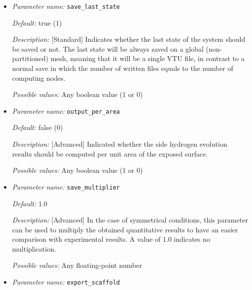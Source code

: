 \begin{itemize}
{\it Description:} [Standard] The interval of saving results, text and VTK (if selected), to disk. 

{\it Possible values:} Any floating-point number


\item {\it Parameter name:} {\tt save\_last\_state}
\label{parameters:save_last_state}


{\it Default:} true (1)

{\it Description:} [Standard] Indicates whether the last state of the system should be saved or not. The last state will be always saved on a global (non-partitioned) mesh, meaning that it will be a single VTU file, in contrast to a normal save in which the number of written files equals to the number of computing nodes.

{\it Possible values:} Any boolean value (1 or 0)


\item {\it Parameter name:} {\tt output\_per\_area}
\label{parameters:output_per_area}


{\it Default:} false (0)

{\it Description:} [Advanced] Indicated whether the side hydrogen evolution results should be computed per unit area of the exposed surface.

{\it Possible values:} Any boolean value (1 or 0)


\item {\it Parameter name:} {\tt save\_multiplier}
\label{parameters:save_multiplier}


{\it Default:} 1.0

{\it Description:} [Advanced] In the case of symmetrical conditions, this parameter can be used to multiply the obtained quantitative results to have an easier comparison with experimental results. A value of 1.0 indicates no multiplication.

{\it Possible values:} Any floating-point number


\item {\it Parameter name:} {\tt export\_scaffold}
\label{parameters:export_scaffold}


\end{itemize}
